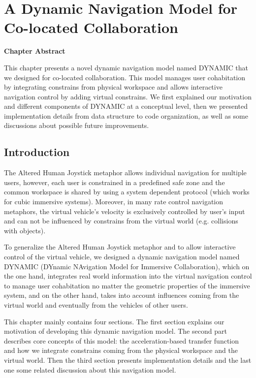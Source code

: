 \chapter{A Dynamic Navigation Model for Co-located Collaboration}
\label{chapter:dynamic_model}
\pagebreak

\textbf{Chapter Abstract}

This chapter presents a novel dynamic navigation model named DYNAMIC that we designed for co-located collaboration. This model manages user cohabitation by integrating constrains from physical workspace and allows interactive navigation control by adding virtual constrains. We first explained our motivation and different components of DYNAMIC at a conceptual level, then we presented implementation details from data structure to code organization, as well as some discussions about possible future improvements.

\vspace*{2\baselineskip}

\minitoc

\newpage
\section{Introduction}
The Altered Human Joystick metaphor allows individual navigation for multiple users, however, each user is constrained in a predefined safe zone and the common workspace is shared by using a system dependent protocol (which works for cubic immersive systems). Moreover, in many rate control navigation metaphors, the virtual vehicle's velocity is exclusively controlled by user's input and can not be influenced by constrains from the virtual world (e.g. collisions with objects). 

To generalize the Altered Human Joystick metaphor and to allow interactive control of the virtual vehicle, we designed a dynamic navigation model named DYNAMIC (DYnamic NAvigation Model for Immersive Collaboration), which on the one hand, integrates real world information into the virtual navigation control to manage user cohabitation no matter the geometric properties of the immersive system, and on the other hand, takes into account influences coming from the virtual world and eventually from the vehicles of other users.

This chapter mainly contains four sections. The first section explains our motivation of developing this dynamic navigation model. The second part describes core concepts of this model: the acceleration-based transfer function and how we integrate constrains coming from the physical workspace and the virtual world. Then the third section presents implementation details and the last one some related discussion about this navigation model.


